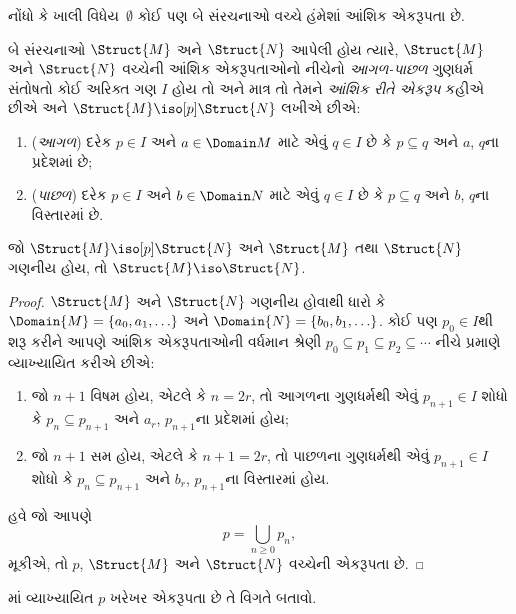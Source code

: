 નોંધો કે ખાલી વિધેય~$\emptyset$ કોઈ પણ બે સંરચનાઓ વચ્ચે હંમેશાં
આંશિક એકરૂપતા છે.

\begin{defn}
  બે સંરચનાઓ $\Struct{M}$ અને $\Struct{N}$ આપેલી હોય ત્યારે,
  $\Struct{M}$ અને $\Struct{N}$ વચ્ચેની આંશિક એકરૂપતાઓનો નીચેનો
  \emph{આગળ-પાછળ} ગુણધર્મ સંતોષતો કોઈ અરિક્ત ગણ $I$ હોય તો અને માત્ર
  તો તેમને \emph{આંશિક રીતે એકરૂપ} કહીએ છીએ અને
  $\Struct{M} \iso[p] \Struct{N}$ લખીએ છીએ:
  \begin{enumerate}
  \item (\emph{આગળ}) દરેક $p \in I$ અને $a \in \Domain M$ માટે એવું
    $q \in I$ છે કે $p \subseteq q$ અને $a$, $q$ના પ્રદેશમાં છે;
  \item (\emph{પાછળ}) દરેક $p \in I$ અને $b \in \Domain N$ માટે એવું
    $q \in I$ છે કે $p \subseteq q$ અને $b$, $q$ના વિસ્તારમાં છે.
  \end{enumerate}
\end{defn}

\begin{thm}
  જો $\Struct{M} \iso[p] \Struct{N}$ અને $\Struct{M}$ તથા
  $\Struct{N}$ ગણનીય હોય, તો $\Struct{M} \iso \Struct{N}$.
\end{thm}

\begin{proof}
  $\Struct{M}$ અને $\Struct{N}$ ગણનીય હોવાથી ધારો કે
  $\Domain{M} = \{a_0, a_1, \ldots \}$ અને $\Domain{N} =
  \{b_0, b_1, \ldots \}$. કોઈ પણ $p_0 \in I$થી શરૂ કરીને આપણે આંશિક
  એકરૂપતાઓની વર્ધમાન શ્રેણી $p_0 \subseteq p_1 \subseteq p_2
  \subseteq \cdots$ નીચે પ્રમાણે વ્યાખ્યાયિત કરીએ છીએ:
  \begin{enumerate}
  \item જો $n+1$ વિષમ હોય, એટલે કે $n = 2r$, તો આગળના ગુણધર્મથી એવું
    $p_{n+1} \in I$ શોધો કે $p_n \subseteq p_{n+1}$ અને $a_r$,
    $p_{n+1}$ના પ્રદેશમાં હોય;
  \item જો $n+1$ સમ હોય, એટલે કે $n+1 =2r$, તો પાછળના ગુણધર્મથી એવું
    $p_{n+1} \in I$ શોધો કે $p_n \subseteq p_{n+1}$ અને $b_r$,
    $p_{n+1}$ના વિસ્તારમાં હોય.
  \end{enumerate}
હવે જો આપણે
\[
p = \bigcup_{n\ge 0} p_n,
\]
મૂકીએ, તો $p$, $\Struct{M}$ અને $\Struct{N}$ વચ્ચેની એકરૂપતા છે.
\end{proof}

\begin{prob}
  માં વ્યાખ્યાયિત $p$ ખરેખર એકરૂપતા
  છે તે વિગતે બતાવો.
\end{prob}

